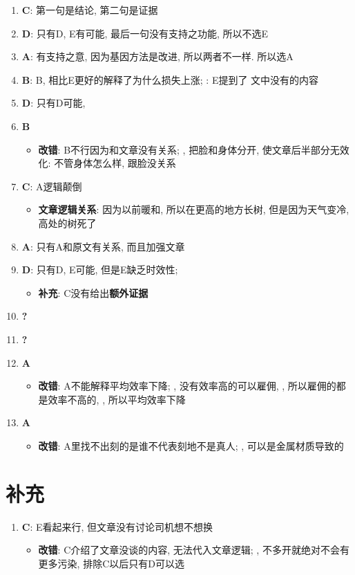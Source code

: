   \begin{enumerate}
    \item \textbf{C}: 第一句是结论, 第二句是证据
    \item \textbf{D}: 只有D, E有可能, 最后一句没有支持之功能, 所以不选E
    \item \textbf{A}: 有支持之意, 因为基因方法是改进, 所以两者不一样.
    所以选A
    \item \textbf{B}: B, 相比E更好的解释了为什么损失上涨; : E提到了
    文中没有的内容
    \item \textbf{D}: 只有D可能, 
    \item \textbf{B}
    \begin{itemize}
      \item \textbf{改错}: B不行因为和文章没有关系;
      , 把脸和身体分开, 使文章后半部分无效化: 不管身体怎么样, 跟脸没关系
    \end{itemize}

    \item \textbf{C}: A逻辑颠倒
    \begin{itemize}
      \item \textbf{文章逻辑关系}: 因为以前暖和, 所以在更高的地方长树, 但是因为天气变冷,
      高处的树死了
    \end{itemize}

    \item \textbf{A}: 只有A和原文有关系, 而且加强文章
    \item \textbf{D}: 只有D, E可能, 但是E缺乏时效性;
    \begin{itemize}
      \item \textbf{补充}: C没有给出\textbf{额外证据}
    \end{itemize}

    \item \textbf{?}
    \item \textbf{?}

    \item \textbf{A}
    \begin{itemize}
      \item \textbf{改错}: A不能解释平均效率下降; , 没有效率高的可以雇佣,
      , 所以雇佣的都是效率不高的, ,
      所以平均效率下降
    \end{itemize}

    \item \textbf{A}
    \begin{itemize}
      \item \textbf{改错}: A里找不出刻的是谁不代表刻地不是真人; ,
      可以是金属材质导致的
    \end{itemize}
  \end{enumerate}

\section{补充}

  \begin{enumerate}
    \item \textbf{C}: E看起来行, 但文章没有讨论司机想不想换
    \begin{itemize}
      \item \textbf{改错}: C介绍了文章没谈的内容, 无法代入文章逻辑; ,
      不多开就绝对不会有更多污染, 排除C以后只有D可以选
    \end{itemize}
  \end{enumerate}
